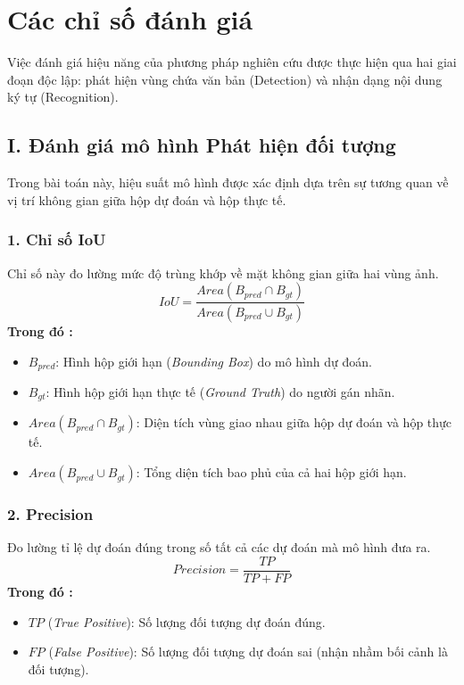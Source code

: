 \appendix
\chapter{Các chỉ số đánh giá}
\label{AppendixA}

Việc đánh giá hiệu năng của phương pháp nghiên cứu được thực hiện qua hai giai đoạn độc lập: phát hiện vùng chứa văn bản (Detection) và nhận dạng nội dung ký tự (Recognition).

\section*{I. Đánh giá mô hình Phát hiện đối tượng}

Trong bài toán này, hiệu suất mô hình được xác định dựa trên sự tương quan về vị trí không gian giữa hộp dự đoán và hộp thực tế.

\subsection*{1. Chỉ số IoU}
Chỉ số này đo lường mức độ trùng khớp về mặt không gian giữa hai vùng ảnh.
\begin{equation}
IoU = \frac{Area(B_{pred} \cap B_{gt})}{Area(B_{pred} \cup B_{gt})}
\end{equation}
\textbf{Trong đó :}
\begin{itemize}
    \item $B_{pred}$: Hình hộp giới hạn (\textit{Bounding Box}) do mô hình dự đoán.
    \item $B_{gt}$: Hình hộp giới hạn thực tế (\textit{Ground Truth}) do người gán nhãn.
    \item $Area(B_{pred} \cap B_{gt})$: Diện tích vùng giao nhau giữa hộp dự đoán và hộp thực tế.
    \item $Area(B_{pred} \cup B_{gt})$: Tổng diện tích bao phủ của cả hai hộp giới hạn.
\end{itemize}

\subsection*{2. Precision}
Đo lường tỉ lệ dự đoán đúng trong số tất cả các dự đoán mà mô hình đưa ra.
\begin{equation}
Precision = \frac{TP}{TP + FP}
\end{equation}
\textbf{Trong đó :}
\begin{itemize}
    \item $TP$ (\textit{True Positive}): Số lượng đối tượng dự đoán đúng.
    \item $FP$ (\textit{False Positive}): Số lượng đối tượng dự đoán sai (nhận nhầm bối cảnh là đối tượng).
\end{itemize}

